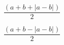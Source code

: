 \documentclass{article}
\begin{document}
\[ \frac{(a + b + \left|a - b \right|)}{2} \]
\pagebreak

\[ \frac{(a + b - \left|a - b \right|)}{2} \]
\pagebreak
\end{document}
